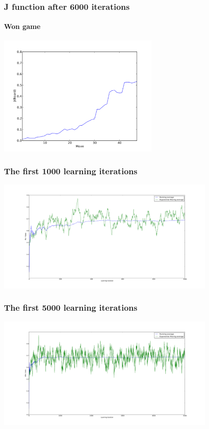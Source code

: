 \documentclass[10pt]{beamer}
\begin{document}
\begin{frame}
  \frametitle{J function after 6000 iterations}
  \framesubtitle{Won game}
  \begin{center} \includegraphics[height=6cm]{Graphs/J_6000iterations_win.pdf} \end{center}
\end{frame}

\begin{frame}
  \frametitle{The first 1000 learning iterations}
  \begin{center} \includegraphics[trim= 6cm 2cm 2cm 2cm, clip, height=5.6cm]{Graphs/Learning_2ply_First1000.pdf} \end{center}
\end{frame}

\begin{frame}
  \frametitle{The first 5000 learning iterations}
  \begin{center} \includegraphics[trim= 6cm 2cm 2cm 2cm, clip, height=5.6cm]{Graphs/Learning_2ply_First5000_exp.pdf} \end{center}
\end{frame}
\end{document}
